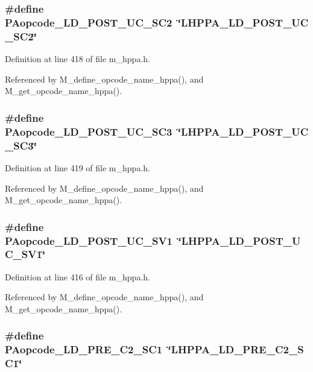 \subsubsection{\setlength{\rightskip}{0pt plus 5cm}\#define PAopcode\_\-LD\_\-POST\_\-UC\_\-SC2~\char`\"{}LHPPA\_\-LD\_\-POST\_\-UC\_\-SC2\char`\"{}}\label{m__hppa_8h_cf12dc680a6531b6739dc55b9e84c9d9}




Definition at line 418 of file m\_\-hppa.h.

Referenced by M\_\-define\_\-opcode\_\-name\_\-hppa(), and M\_\-get\_\-opcode\_\-name\_\-hppa().
\subsubsection{\setlength{\rightskip}{0pt plus 5cm}\#define PAopcode\_\-LD\_\-POST\_\-UC\_\-SC3~\char`\"{}LHPPA\_\-LD\_\-POST\_\-UC\_\-SC3\char`\"{}}\label{m__hppa_8h_898c7b2698a3ec63c3bd8d39ba2571f4}




Definition at line 419 of file m\_\-hppa.h.

Referenced by M\_\-define\_\-opcode\_\-name\_\-hppa(), and M\_\-get\_\-opcode\_\-name\_\-hppa().
\subsubsection{\setlength{\rightskip}{0pt plus 5cm}\#define PAopcode\_\-LD\_\-POST\_\-UC\_\-SV1~\char`\"{}LHPPA\_\-LD\_\-POST\_\-UC\_\-SV1\char`\"{}}\label{m__hppa_8h_e87c59b09663f53424993788f4cea01f}




Definition at line 416 of file m\_\-hppa.h.

Referenced by M\_\-define\_\-opcode\_\-name\_\-hppa(), and M\_\-get\_\-opcode\_\-name\_\-hppa().
\subsubsection{\setlength{\rightskip}{0pt plus 5cm}\#define PAopcode\_\-LD\_\-PRE\_\-C2\_\-SC1~\char`\"{}LHPPA\_\-LD\_\-PRE\_\-C2\_\-SC1\char`\"{}}\label{m__hppa_8h_180a4f024f73139c9ea6955b0c5bc1ac}




